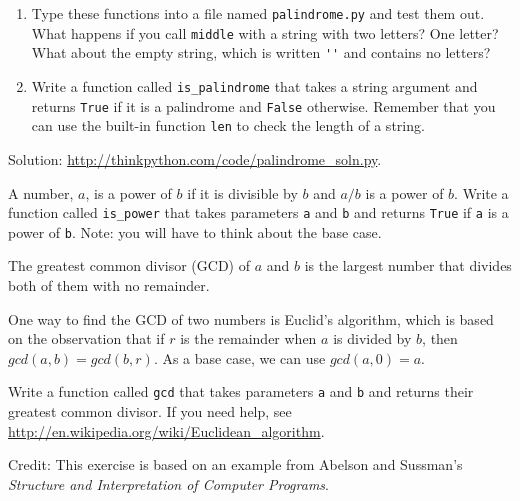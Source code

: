 \documentclass[10pt]{book}
\begin{document}
\begin{CJK}{UTF8}{gbsn}
\begin{exercise}
\begin{enumerate}

\item Type these functions into a file named {\tt palindrome.py}
and test them out.  What happens if you call {\tt middle} with
a string with two letters?  One letter?  What about the empty
string, which is written \verb"''" and contains no letters?

\item Write a function called \verb"is_palindrome" that takes
a string argument and returns {\tt True} if it is a palindrome
and {\tt False} otherwise.  Remember that you can use the
built-in function {\tt len} to check the length of a string.

\end{enumerate}

Solution: \url{http://thinkpython.com/code/palindrome_soln.py}.

\end{exercise}

\begin{exercise}

A number, $a$, is a power of $b$ if it is divisible by $b$
and $a/b$ is a power of $b$.  Write a function called
\verb"is_power" that takes parameters {\tt a} and {\tt b}
and returns {\tt True} if {\tt a} is a power of {\tt b}.
Note: you will have to think about the base case.

\end{exercise}


\begin{exercise}

The greatest common divisor (GCD) of $a$ and $b$ is the largest number
that divides both of them with no remainder.  

One way to find the GCD of two numbers is Euclid's algorithm,
which is based on the observation that if $r$ is the remainder
when $a$ is divided by $b$, then $gcd(a, b) = gcd(b, r)$.
As a base case, we can use $gcd(a, 0) = a$.

Write a function called
\verb"gcd" that takes parameters {\tt a} and {\tt b}
and returns their greatest common divisor.  If you need
help, see \url{http://en.wikipedia.org/wiki/Euclidean_algorithm}.

Credit: This exercise is based on an example from Abelson and
Sussman's {\em Structure and Interpretation of Computer Programs}.


\end{exercise}
\end{CJK}
\end{document}
